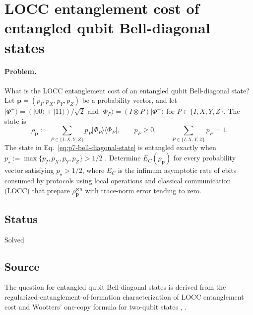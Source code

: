 \section{LOCC entanglement cost of entangled qubit Bell-diagonal states}
\label{sec:op_aa21ac5ebca8b888}

\paragraph{Problem.}
What is the LOCC entanglement cost of an entangled qubit Bell-diagonal state?
Let $\mathbf p=(p_I,p_X,p_Y,p_Z)$ be a probability vector, and let
$\lvert\Phi^+\rangle=(\lvert00\rangle+\lvert11\rangle)/\sqrt2$ and
$\lvert\Phi_P\rangle=(I\otimes P)\lvert\Phi^+\rangle$ for
$P\in\{I,X,Y,Z\}$.  The state is
\begin{equation}
  \rho_{\mathbf p}
  :=\sum_{P\in\{I,X,Y,Z\}}p_P
      \lvert\Phi_P\rangle\!\langle\Phi_P\rvert,
  \qquad p_P\geq0,
  \qquad \sum_{P\in\{I,X,Y,Z\}}p_P=1.
  \label{eq:p7-bell-diagonal-state}
\end{equation}
The state in Eq.~\eqref{eq:p7-bell-diagonal-state} is entangled exactly when
$p_\star:=\max\{p_I,p_X,p_Y,p_Z\}>1/2$
.  Determine
$E_C(\rho_{\mathbf p})$ for every probability vector satisfying
$p_\star>1/2$, where $E_C$ is the infimum asymptotic rate of ebits consumed
by protocols using local operations and classical communication (LOCC)
that prepare $\rho_{\mathbf p}^{\otimes n}$ with trace-norm error tending to
zero.

\subsection*{Status}

Solved

\subsection*{Source}

The question for entangled qubit Bell-diagonal states is derived from the
regularized-entanglement-of-formation characterization of LOCC entanglement
cost and Wootters' one-copy formula for two-qubit states ,
.

